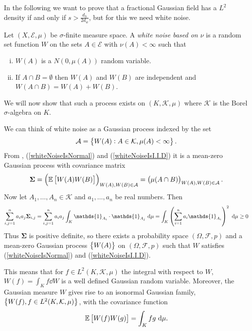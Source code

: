 In the following we want to prove that a fractional Gaussian field has a $L^2$ density if and only if $s > \frac{d_h}{2d_w}$, but for this we need white noise.

\medskip
\begin{defi}\label{whiteNoise}
	Let $(X, \mathcal{E}, \mu)$ be $\sigma$-finite measure space. A \emph{white noise based on $\nu$} is a random set function $W$ on the sets $A \in \mathcal{E}$ with $\nu(A) < \infty$ such that
	\begin{enumerate}[(i)]
		\item $W(A)$ is a $N(0, \mu(A))$ random variable. \label{whiteNoiseIsNormal}
		\item If $A \cap B = \emptyset$ then $W(A)$ and $W(B)$ are independent and $W(A \cap B) = W(A) + W(B)$. \label{whiteNoiseIsI.I.D}
	\end{enumerate}
\end{defi}

\medskip 
\noi We will now show that such a process exists on $(K, \mathcal{K}, \mu)$ where  $\mathcal{K}$ is the Borel $\sigma$-algebra on $K$. 

We can think of white noise as a Gaussian process indexed by the set 
\begin{equation}
	\mathcal{A} = \cbr{W(A) : A \in \mathcal{K}, \mu(A) < \infty}.
\end{equation} 
From , (\ref{whiteNoiseIsNormal}) and (\ref{whiteNoiseIsI.I.D}) it is a mean-zero Gaussian process with covariance matrix
\begin{equation}
	\mathbf{\Sigma} = \left(\e \left[W(A) W(B)\right]\right)_{W(A), W(B) \in \mathcal{A}} = \left(\mu(A \cap B)\right)_{W(A), W(B) \in \mathcal{A}}.
\end{equation}
Now let $A_1, \ldots, A_n \in \mathcal{K}$ and $a_1, \ldots, a_n$ be real numbers. Then
\begin{equation}
	\sum_{i,j=1}^{n} a_i a_j \mathbf{\Sigma}_{i,j}= \sum_{i,j = 1}^{n}a_ia_j \int_{K}\mathds{1}_{A_i} \cd \mathds{1}_{A_j} \dd \mu = \int_{K} \left(\sum_{i=1}^{n} a_i \mathds{1}_{A_i}\right)^2 \dd \mu \geq 0
\end{equation}
Thus $\mathbf{\Sigma}$ is positive definite, so there exists a probability space $(\Omega, \mathcal{F}, p)$ and a mean-zero Gaussian process $\cbr{W(A)}$ on $(\Omega, \mathcal{F}, p)$ such that $W$ satisfies  (\ref{whiteNoiseIsNormal}) and (\ref{whiteNoiseIsI.I.D}). 

This means that for $f \in L^{2}(K, \mathcal{K}, \mu)$ the integral with respect to $W$, $W(f) = \int_{K} f \dd W$ is a well defined Gaussian random variable. Moreover, the Gaussian measure $W$ gives rise to an isonormal Gaussian family, $\cbr{W(f), f \in L^{2}(K, \mathcal{K}, \mu)}$, with the covariance function
\begin{equation}
	\mathbb{E} \left[W(f) W(g)\right] = \int_{K} fg \ \text{d} \mu.
\end{equation}


